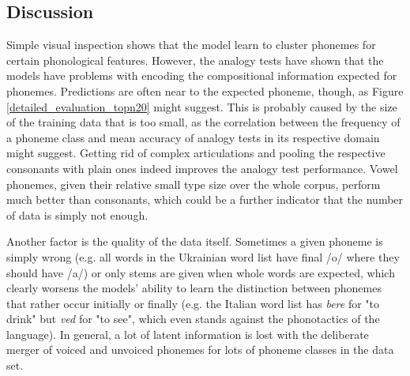\documentclass[11pt]{article}
\begin{document}
\subsection{Discussion}
Simple visual inspection shows that the model learn to cluster phonemes for certain phonological features. However, the analogy tests have shown that the models have problems with encoding the compositional information expected for phonemes. Predictions are often near to the expected phoneme, though, as Figure \ref{detailed_evaluation_topn20} might suggest. This is probably caused by the size of the training data that is too small, as the correlation between the frequency of a phoneme class and mean accuracy of analogy tests in its respective domain might suggest. Getting rid of complex articulations and pooling the respective consonants with plain ones indeed improves the analogy test performance. Vowel phonemes, given their relative small type size over the whole corpus, perform much better than consonants, which could be a further indicator that the number of data is simply not enough. 

Another factor is the quality of the data itself. Sometimes a given phoneme is simply wrong (e.g. all words in the Ukrainian word list have final /o/ where they should have /a/) or only stems are given when whole words are expected, which clearly worsens the models' ability to learn the distinction between phonemes that rather occur initially or finally (e.g. the Italian word list has \textit{bere} for "to drink" but \textit{ved} for "to see", which even stands against the phonotactics of the language). In general, a lot of latent information is lost with the deliberate merger of voiced and unvoiced phonemes for lots of phoneme classes in the data set. 
\end{document}
